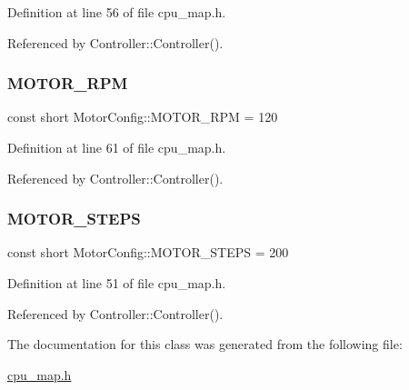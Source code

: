 Definition at line 56 of file cpu\+\_\+map.\+h.



Referenced by Controller\+::\+Controller().

\mbox{\label{class_motor_config_abe3fe3efcce60033bf58a93fda1c1011}} 
\subsubsection{\texorpdfstring{M\+O\+T\+O\+R\+\_\+\+R\+PM}{MOTOR\_RPM}}
{\footnotesize\ttfamily const short Motor\+Config\+::\+M\+O\+T\+O\+R\+\_\+\+R\+PM = 120\hspace{0.3cm}{\ttfamily [static]}}



Definition at line 61 of file cpu\+\_\+map.\+h.



Referenced by Controller\+::\+Controller().

\mbox{\label{class_motor_config_a7c9848ce827ad884f69001c8517178a7}} 
\subsubsection{\texorpdfstring{M\+O\+T\+O\+R\+\_\+\+S\+T\+E\+PS}{MOTOR\_STEPS}}
{\footnotesize\ttfamily const short Motor\+Config\+::\+M\+O\+T\+O\+R\+\_\+\+S\+T\+E\+PS = 200\hspace{0.3cm}{\ttfamily [static]}}



Definition at line 51 of file cpu\+\_\+map.\+h.



Referenced by Controller\+::\+Controller().



The documentation for this class was generated from the following file\+:\begin{DoxyCompactItemize}
\item 
\hyperlink{cpu__map_8h}{cpu\+\_\+map.\+h}\end{DoxyCompactItemize}

